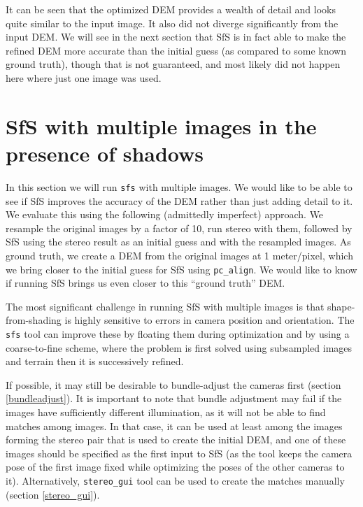 It can be seen that the optimized DEM provides a wealth of detail and
looks quite similar to the input image. It also did not diverge
significantly from the input DEM. We will see in the next section that
SfS is in fact able to make the refined DEM more accurate than the
initial guess (as compared to some known ground truth), though that is
not guaranteed, and most likely did not happen here where just one image
was used.

\section{SfS with multiple images in the presence of shadows}

In this section we will run \texttt{sfs} with multiple images. We would
like to be able to see if SfS improves the accuracy of the DEM rather
than just adding detail to it. We evaluate this using the following
(admittedly imperfect) approach. We resample the original images by a
factor of 10, run stereo with them, followed by SfS using the stereo
result as an initial guess and with the resampled images. As ground
truth, we create a DEM from the original images at 1 meter/pixel, which
we bring closer to the initial guess for SfS using
\texttt{pc\_align}. We would like to know if running SfS brings us even
closer to this ``ground truth'' DEM.

The most significant challenge in running SfS with multiple images is
that shape-from-shading is highly sensitive to errors in camera position
and orientation. The \texttt{sfs} tool can improve these by floating
them during optimization and by using a coarse-to-fine scheme, where
the problem is first solved using subsampled images and terrain then
it is successively refined.

If possible, it may still be desirable to bundle-adjust the cameras first
(section \ref{bundleadjust}). It is important to note that bundle adjustment may
fail if the images have sufficiently different illumination, as it will
not be able to find matches among images. In that case, it can be used
at least among the images forming the stereo pair that is used to create
the initial DEM, and one of these images should be specified as the
first input to SfS (as the tool keeps the camera pose of the first image
fixed while optimizing the poses of the other cameras to
it). Alternatively, \texttt{stereo\_gui} tool can be used to create the
matches manually (section \ref{stereo_gui}).

